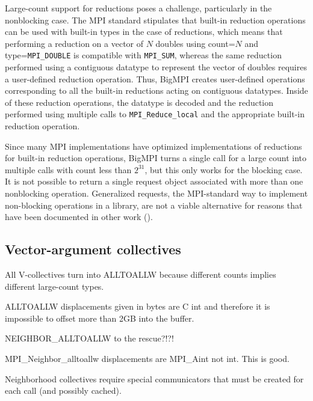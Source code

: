 Large-count support for reductions poses a challenge, particularly in the nonblocking case.
The MPI standard stipulates that built-in reduction operations can be used with built-in types
in the case of reductions, which means that performing a reduction on a vector of $N$
doubles using count=$N$ and type=\texttt{MPI\_DOUBLE} is compatible with \texttt{MPI\_SUM},
whereas the same reduction performed using a contiguous datatype to represent the vector
of doubles requires a user-defined reduction operation.
Thus, BigMPI creates user-defined operations corresponding to all the built-in reductions
acting on contiguous datatypes.  Inside of these reduction operations, the datatype is
decoded and the reduction performed using multiple calls to \texttt{MPI\_Reduce\_local}
and the appropriate built-in reduction operation.

Since many MPI implementations have optimized implementations of reductions for
built-in reduction operations, BigMPI turns a single call for a large count into multiple
calls with count less than $2^{31}$, but this only works for the blocking case.
It is not possible to return a single request object associated with more than one
nonblocking operation.  Generalized requests, the MPI-standard way to implement non-blocking operations in a library,  are not a viable alternative for
reasons that have been documented in other work (\cite{latham:grequest-extensions}).




\subsection{Vector-argument collectives}

All V-collectives turn into ALLTOALLW because different counts implies different large-count types.

ALLTOALLW displacements given in bytes are C int and therefore it is impossible to offset more than 2GB into the buffer.

NEIGHBOR\_ALLTOALLW to the rescue?!?!

MPI\_Neighbor\_alltoallw displacements are MPI\_Aint not int.  This is good.

Neighborhood collectives require special communicators that must be created for each call (and possibly cached).

